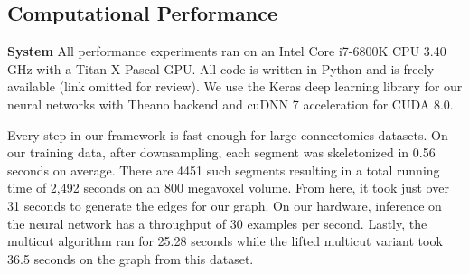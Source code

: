 \begin{table}[h]
	\caption{Precision, recall, and accuracy changes between CNN only and CNN paired with graph-optimized reconstructions for the training and three test datasets. The combined method results in better precision and accuracy. The lifted multicut extension provides very slight improvements in recall and accuracy over these three datasets.}
	\centering
{}
	\label{table:multicut}
\end{table}


\subsection{Computational Performance}
\noindent\textbf{System}
All performance experiments ran on an Intel Core i7-6800K CPU 3.40 GHz with a Titan X Pascal GPU. All code is written in Python and is freely available (link omitted for review). We use the Keras deep learning library for our neural networks with Theano backend and cuDNN 7 acceleration for CUDA 8.0.

Every step in our framework is fast enough for large connectomics datasets. 
On our training data, after downsampling, each segment was skeletonized in 0.56 seconds on average.
There are 4451 such segments resulting in a total running time of 2,492 seconds on an 800 megavoxel volume. 
From here, it took just over 31 seconds to generate the edges for our graph.
On our hardware, inference on the neural network has a throughput of 30 examples per second. 
Lastly, the multicut algorithm ran for 25.28 seconds while the lifted multicut variant took 36.5 seconds on the graph from this dataset.
